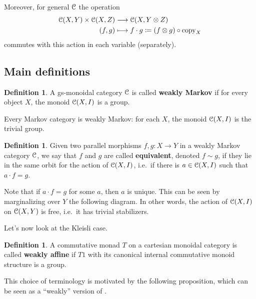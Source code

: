 \documentclass[a4paper,UKenglish,numberwithinsect,cleveref, autoref, thm-restate]{lipics-v2021}
\theoremstyle{plain} %
\theoremstyle{definition} %
\newtheorem{mydefinition}[mytheorem]{Definition}
\begin{document}
Moreover, for general $\mathcal{C}$ the operation
\begin{align*}
	\mathcal{C}(X,Y) \times \mathcal{C}(X,Z) & \longrightarrow \mathcal{C}(X,Y \otimes Z)		\\
	(f,g) & \longmapsto f\cdot g \coloneqq (f\otimes g)\circ\mathrm{copy}_X
\end{align*}
commutes with this action in each variable (separately). 

\subsection{Main definitions}


\begin{mydefinition}
 A gs-monoidal category $\mathcal{C}$ is called \textbf{weakly Markov} if for every object $X$, the monoid $\mathcal{C}(X,I)$ is a group. 
\end{mydefinition}

Every Markov category is weakly Markov: for each $X$, the monoid $\mathcal{C}(X,I)$ is the trivial group.

\begin{mydefinition}
 Given two parallel morphisms $f,g:X\to Y$ in a weakly Markov category $\mathcal{C}$, we say that $f$ and $g$ are called \textbf{equivalent}, denoted $f\sim g$, if they lie in the same orbit for the action of $\mathcal{C}(X,I)$, i.e.~if there is $a\in \mathcal{C}(X,I)$ such that $a\cdot f=g$.
\end{mydefinition}

Note that if $a\cdot f=g$ for some $a$, then $a$ is unique. This can be seen by marginalizing over $Y$ the following diagram.
In other words, the action of $\mathcal{C}(X,I)$ on $\mathcal{C}(X,Y)$ is free, i.e.~it has trivial stabilizers.



Let's now look at the Kleisli case.

\begin{mydefinition}
 A commutative monad $T$ on a cartesian monoidal category is called \textbf{weakly affine} if $T1$ with its canonical internal commutative monoid structure is a group.
\end{mydefinition}

This choice of terminology is motivated by the following proposition, which can be seen as a ``weakly'' version of .
\end{document}
